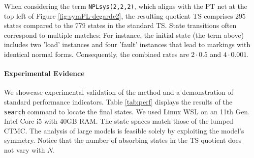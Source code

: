 
When considering the term \verb|NPLsys(2,2,2)|, which aligns with the PT net at the top left of Figure \ref{fig:symPL-degarde2}, the resulting quotient TS comprises 295 states compared to the 779 states in the standard TS. State transitions often correspond to multiple matches: For instance, the initial state (the term above) includes two 'load' instances and four 'fault' instances that lead to markings with identical normal forms. Consequently, the combined rates are $2\cdot0.5$ and $4\cdot0.001$. 

\vspace{-10pt}
\paragraph{Experimental Evidence}
We showcase experimental validation of the method and a demonstration of standard performance indicators. Table \ref{tab:perf} displays the results of the \texttt{search} command to locate the final states.
We used Linux WSL on an 11th Gen. Intel Core i5 with 40GB RAM. The state spaces match those of the lumped CTMC. The analysis of large models is feasible solely by exploiting the model's symmetry.
Notice that the number of absorbing states in the TS quotient does not vary with $N$. 

